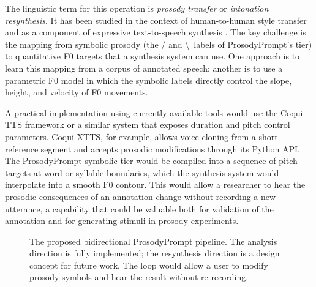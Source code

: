 The linguistic term for this operation is \emph{prosody transfer} or
\emph{intonation resynthesis}. It has been studied in the context of
human-to-human style transfer and as a component of expressive text-to-speech
synthesis \cite{skerry2018towards}. The key challenge is the mapping from
symbolic prosody (the / and \textbackslash\ labels of ProsodyPrompt's tier) to
quantitative F0 targets that a synthesis system can use. One approach is to
learn this mapping from a corpus of annotated speech; another is to use a
parametric F0 model in which the symbolic labels directly control the slope,
height, and velocity of F0 movements.

A practical implementation using currently available tools would use the
Coqui TTS framework or a similar system that exposes duration and pitch control
parameters. Coqui XTTS, for example, allows voice cloning from a short reference
segment and accepts prosodic modifications through its Python API. The ProsodyPrompt
symbolic tier would be compiled into a sequence of pitch targets at word or
syllable boundaries, which the synthesis system would interpolate into a smooth
F0 contour. This would allow a researcher to hear the prosodic consequences of an
annotation change without recording a new utterance, a capability that could be
valuable both for validation of the annotation and for generating stimuli in
prosody experiments.

\begin{figure}[htbp]
\centering
{}
\caption{The proposed bidirectional ProsodyPrompt pipeline. The analysis direction
is fully implemented; the resynthesis direction is a design concept for future
work. The loop would allow a user to modify prosody symbols and hear the result
without re-recording.}
\label{fig:resynthesis_pipeline}
\end{figure}

